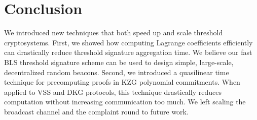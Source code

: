 \section{Conclusion}

We introduced new techniques that both speed up and scale threshold cryptosystems.
First, we showed how computing Lagrange coefficients efficiently can drastically reduce threshold signature aggregation time.
We believe our fast BLS threshold signature scheme can be used to design simple, large-scale, decentralized random beacons.
Second, we introduced a quasilinear time technique for precomputing proofs in KZG polynomial commitments.
When applied to VSS and DKG protocols, this technique drastically reduces computation without increasing communication too much.
We left scaling the broadcast channel and the complaint round to future work.